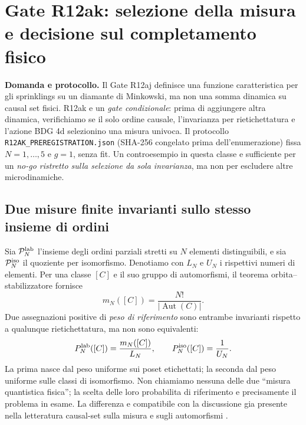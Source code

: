 \documentclass[11pt,a4paper]{article}
\begin{document}
\section{Gate R12ak: selezione della misura e decisione sul completamento fisico}
\label{sec:r12ak}

\textbf{Domanda e protocollo.} Il Gate R12aj definisce una funzione caratteristica per gli sprinklings su un diamante di Minkowski, ma non una somma dinamica su causal set fisici. R12ak e un \emph{gate condizionale}: prima di aggiungere altra dinamica, verifichiamo se il solo ordine causale, l'invarianza per rietichettatura e l'azione BDG 4d selezionino una misura univoca. Il protocollo \texttt{R12AK\_PREREGISTRATION.json} (SHA-256 congelato prima dell'enumerazione) fissa $N=1,\ldots,5$ e $g=1$, senza fit. Un controesempio in questa classe e sufficiente per un \emph{no-go ristretto sulla selezione da sola invarianza}, ma non per escludere altre microdinamiche.

\subsection{Due misure finite invarianti sullo stesso insieme di ordini}

Sia $\mathcal P_N^{\rm lab}$ l'insieme degli ordini parziali stretti su $N$ elementi distinguibili, e sia $\mathcal P_N^{\rm iso}$ il quoziente per isomorfismo. Denotiamo con $L_N$ e $U_N$ i rispettivi numeri di elementi. Per una classe $[C]$ e il suo gruppo di automorfismi, il teorema orbita--stabilizzatore fornisce
\begin{equation}
 m_N([C])=\frac{N!}{|\operatorname{Aut}(C)|}.
 \label{eq:r12ak_orbit}
\end{equation}
Due assegnazioni positive di \emph{peso di riferimento} sono entrambe invarianti rispetto a qualunque rietichettatura, ma non sono equivalenti:
\begin{equation}
 P_N^{\rm lab}([C])=\frac{m_N([C])}{L_N},\qquad
 P_N^{\rm iso}([C])=\frac1{U_N}.
 \label{eq:r12ak_measures}
\end{equation}
La prima nasce dal peso uniforme sui poset etichettati; la seconda dal peso uniforme sulle classi di isomorfismo. Non chiamiamo nessuna delle due ``misura quantistica fisica''; la scelta delle loro probabilita di riferimento e precisamente il problema in esame. La differenza e compatibile con la discussione gia presente nella letteratura causal-set sulla misura e sugli automorfismi \cite{Surya2019Review}.
\end{document}
